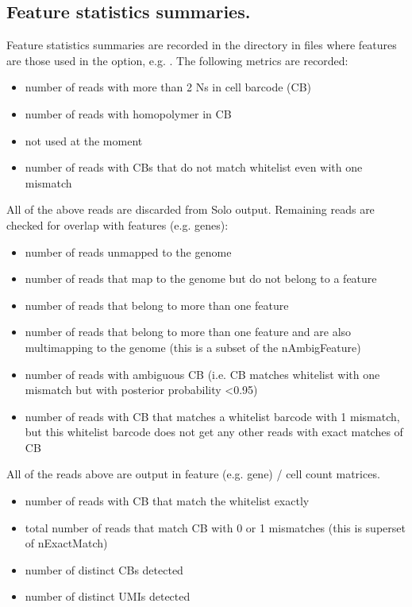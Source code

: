 \documentclass[12pt]{article}
\begin{document}
\subsection{Feature statistics summaries.}
Feature statistics summaries are recorded in the  directory in files  where  features are those used in the  option, e.g.  . The following metrics are recorded:
\begin{itemize}[leftmargin=1.5in]
	\itemsep -0.3em
	\item[\optv{nNinBarcode:}] number of reads with more than 2 Ns in cell barcode (CB)
	\item[\optv{nUMIhomopolymer:}] number of reads with homopolymer in CB
	\item[\optv{nTooMany:}] not used at the moment
	\item[\optv{nNoMatch:}] number of reads with CBs that do not match whitelist even with one mismatch
\end{itemize}
All of the above reads are discarded from Solo output. Remaining reads are checked for overlap with features (e.g. genes):
\begin{itemize}[leftmargin=2in]
	\itemsep -0.3em
	\item[\optv{nUnmapped:}] number of reads unmapped to the genome
	\item[\optv{nNoFeature:}] number of reads that map to the genome but do not belong to a feature
	\item[\optv{nAmbigFeature:}] number of reads that belong to more than one feature
	\item[\optv{nAmbigFeatureMultimap:}] number of reads that belong to more than one feature and are also multimapping to the genome (this is a subset of the nAmbigFeature)
	\item[\optv{nTooMany:}] number of reads with ambiguous CB (i.e. CB matches whitelist with one mismatch but with posterior probability <0.95)
	\item[\optv{nNoExactMatch:}] number of reads with CB that matches a whitelist barcode with 1 mismatch, but this whitelist barcode does not get any other reads with exact matches of CB
\end{itemize}
All of the reads above are output in feature (e.g. gene) / cell count matrices.
\begin{itemize}[leftmargin=1.5in]
	\itemsep -0.3em
	\item[\optv{nExactMatch:}] number of reads with CB that match the whitelist exactly
	\item[\optv{nMatch:}] total number of reads that match CB with 0 or 1 mismatches (this is superset of nExactMatch)
	\item[\optv{nCellBarcodes:}] number of distinct CBs detected
	\item[\optv{nUMIs:}] number of distinct UMIs detected
\end{itemize}
\end{document}
